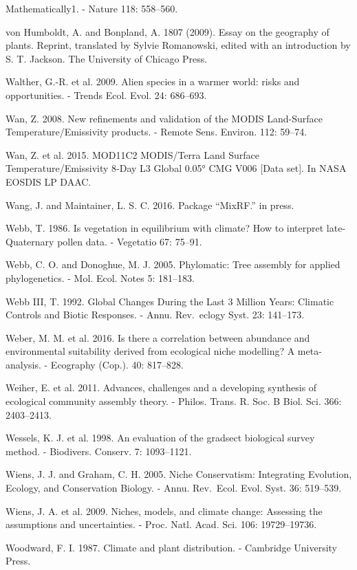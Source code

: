 \documentclass[11pt,twoside]{reedthesis}
\begin{document}
Mathematically1. - Nature 118: 558--560.\par
von Humboldt, A. and Bonpland, A. 1807 (2009). Essay on the geography of
plants. Reprint, translated by Sylvie Romanowski, edited with an
introduction by S. T. Jackson. The University of Chicago Press.\par
Walther, G.-R. et al. 2009. Alien species in a warmer world: risks and
opportunities. - Trends Ecol. Evol. 24: 686--693.\par
Wan, Z. 2008. New refinements and validation of the MODIS Land-Surface
Temperature/Emissivity products. - Remote Sens. Environ. 112:
59--74.\par
Wan, Z. et al. 2015. MOD11C2 MODIS/Terra Land Surface
Temperature/Emissivity 8‐Day L3 Global 0.05° CMG V006 {[}Data set{]}. In
NASA EOSDIS LP DAAC.\par
Wang, J. and Maintainer, L. S. C. 2016. Package ``MixRF.'' in press.\par
Webb, T. 1986. Is vegetation in equilibrium with climate? How to
interpret late-Quaternary pollen data. - Vegetatio 67: 75--91.\par
Webb, C. O. and Donoghue, M. J. 2005. Phylomatic: Tree assembly for
applied phylogenetics. - Mol. Ecol. Notes 5: 181--183.\par
Webb III, T. 1992. Global Changes During the Last 3 Million Years:
Climatic Controls and Biotic Responses. - Annu. Rev.~eclogy Syst. 23:
141--173.\par
Weber, M. M. et al. 2016. Is there a correlation between abundance and
environmental suitability derived from ecological niche modelling? A
meta-analysis. - Ecography (Cop.). 40: 817--828.\par
Weiher, E. et al. 2011. Advances, challenges and a developing synthesis
of ecological community assembly theory. - Philos. Trans. R. Soc. B
Biol. Sci. 366: 2403--2413.\par
Wessels, K. J. et al. 1998. An evaluation of the gradsect biological
survey method. - Biodivers. Conserv. 7: 1093--1121.\par
Wiens, J. J. and Graham, C. H. 2005. Niche Conservatism: Integrating
Evolution, Ecology, and Conservation Biology. - Annu. Rev.~Ecol. Evol.
Syst. 36: 519--539.\par
Wiens, J. A. et al. 2009. Niches, models, and climate change: Assessing
the assumptions and uncertainties. - Proc. Natl. Acad. Sci. 106:
19729--19736.\par
Woodward, F. I. 1987. Climate and plant distribution. - Cambridge
University Press.\par
\end{document}
